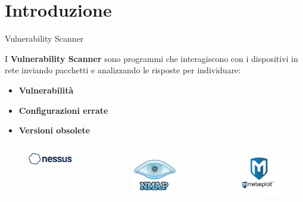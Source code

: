 \section{Introduzione}


\begin{frame}{Vulnerability Scanner}

I \textbf{Vulnerability Scanner} sono programmi che interagiscono con i dispositivi in rete inviando pacchetti e analizzando le risposte per individuare:
\begin{itemize}
    \item \textbf{Vulnerabilità}
    \item \textbf{Configurazioni errate}
    \item \textbf{Versioni obsolete}
\end{itemize}
\begin{columns} 
    \begin{column}{0.3\textwidth}
    \begin{figure}
    \centering
    \includegraphics[width=2.6cm]{assets/mio/nessus.png}
    \end{figure}
    \end{column}
    \begin{column}{0.3\textwidth}
    \begin{figure}
    \centering
    \includegraphics[width=2.6cm]{assets/mio/nmap.png}
    \end{figure}
    \end{column}
    \begin{column}{0.3\textwidth}
    \begin{figure}
    \centering
    \includegraphics[width=2.6cm]{assets/mio/metasploit.jpg}
    \end{figure}
    \end{column}
\end{columns}
\end{frame}

